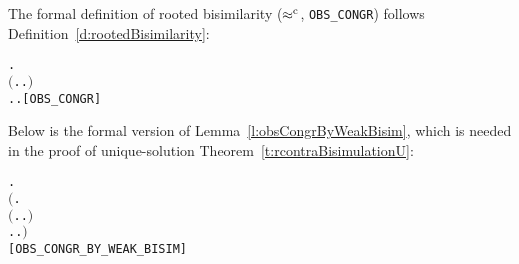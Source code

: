 The formal definition of rooted bisimilarity ($\mathrel{\approx^{\rm{c}}}$, \texttt{OBS_CONGR}) 
follows Definition~\ref{d:rootedBisimilarity}:
\begin{alltt}
 \HOLSymConst{\HOLTokenObsCongr}  \HOLSymConst{\HOLTokenDefEquality{}}
  \HOLSymConst{\HOLTokenForall{}}.
      \ensuremath{(}\HOLSymConst{\HOLTokenForall{}}.  \HOLTokenTransBegin{}\HOLTokenTransEnd {} \HOLSymConst{\HOLTokenImp{}} \HOLSymConst{\HOLTokenExists{}}.  \HOLTokenWeakTransBegin{}\HOLTokenWeakTransEnd {} \HOLSymConst{\HOLTokenConj{}}  \HOLSymConst{\HOLTokenWeakEQ} \ensuremath{)} \HOLSymConst{\HOLTokenConj{}}
      \HOLSymConst{\HOLTokenForall{}}.  \HOLTokenTransBegin{}\HOLTokenTransEnd {} \HOLSymConst{\HOLTokenImp{}} \HOLSymConst{\HOLTokenExists{}}.  \HOLTokenWeakTransBegin{}\HOLTokenWeakTransEnd {} \HOLSymConst{\HOLTokenConj{}}  \HOLSymConst{\HOLTokenWeakEQ} \hfill{[OBS_CONGR]}
\end{alltt}
Below is the formal version of Lemma~\ref{l:obsCongrByWeakBisim}, which is needed in the proof
of unique-solution Theorem~\ref{t:rcontraBisimulationU}:
\begin{alltt}
\HOLTokenTurnstile{}   \HOLSymConst{\HOLTokenImp{}}
   \HOLSymConst{\HOLTokenForall{}} .
       \ensuremath{(}\HOLSymConst{\HOLTokenForall{}}.
            \ensuremath{(}\HOLSymConst{\HOLTokenForall{}}.  \HOLTokenTransBegin{}\HOLTokenTransEnd {} \HOLSymConst{\HOLTokenImp{}} \HOLSymConst{\HOLTokenExists{}}.  \HOLTokenWeakTransBegin{}\HOLTokenWeakTransEnd {} \HOLSymConst{\HOLTokenConj{}}   \ensuremath{)} \HOLSymConst{\HOLTokenConj{}}
            \HOLSymConst{\HOLTokenForall{}}.  \HOLTokenTransBegin{}\HOLTokenTransEnd {} \HOLSymConst{\HOLTokenImp{}} \HOLSymConst{\HOLTokenExists{}}.  \HOLTokenWeakTransBegin{}\HOLTokenWeakTransEnd {} \HOLSymConst{\HOLTokenConj{}}   \ensuremath{)} \HOLSymConst{\HOLTokenImp{}}
        \HOLSymConst{\HOLTokenObsCongr} \hfill{[OBS_CONGR_BY_WEAK_BISIM]}
\end{alltt}

